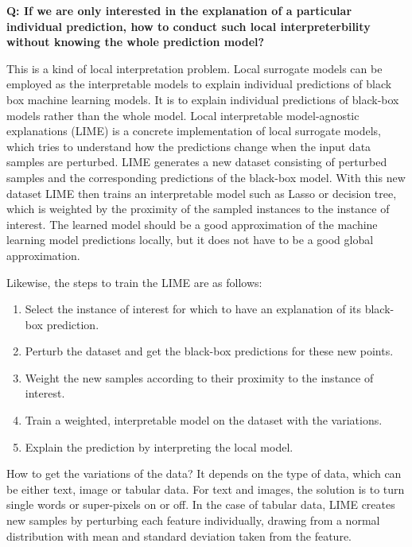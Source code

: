 \documentclass{article}
\begin{document}
\textbf{Q: If we are only interested in the explanation of a particular individual prediction, how to conduct such local interpreterbility without knowing the whole prediction model?}


\vspace{0.5cm}
This is a kind of local interpretation problem. Local surrogate models can be employed as the interpretable models to explain individual predictions of black box machine learning models. It is to explain individual predictions of black-box models rather than the whole model. 
Local interpretable model-agnostic explanations (LIME) is a concrete implementation of local surrogate models, which tries to understand how the predictions change when the input data samples are perturbed.
LIME generates a new dataset consisting of perturbed samples and the corresponding predictions of the black-box model.
With this new dataset LIME then trains an interpretable model such as Lasso or decision tree, which is weighted by the proximity of the sampled instances to the instance of interest. 
The learned model should be a good approximation of the machine learning model predictions locally, but it does not have to be a good global approximation.


Likewise, the steps to train the LIME are as follows:
\begin{enumerate}
    \item Select the instance of interest for which to have an explanation of its black-box prediction.
    \item Perturb the dataset and get the black-box predictions for these new points.
    \item Weight the new samples according to their proximity to the instance of interest.
    \item Train a weighted, interpretable model on the dataset with the variations.
    \item Explain the prediction by interpreting the local model.
\end{enumerate}

How to get the variations of the data? It depends on the type of data, which can be either text, image or tabular data. 
For text and images, the solution is to turn single words or super-pixels on or off. 
In the case of tabular data, LIME creates new samples by perturbing each feature individually, drawing from a normal distribution with mean and standard deviation taken from the feature.
\end{document}
